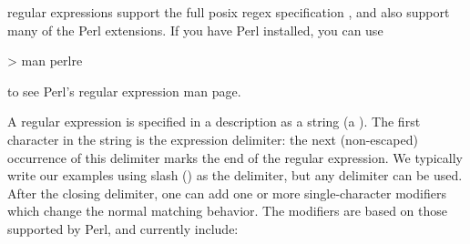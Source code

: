 \pads{} regular expressions support the full posix regex specification
,
and also support many of the Perl extensions.  If you have Perl
installed, you can use 

\begin{centercode}
    > man perlre
\end{centercode}
%
\noindent
to see Perl's regular expression man page.

A regular expression is specified in a \pads{} description
as a string (a ).  The first character in
the string is the expression delimiter: the next (non-escaped) occurrence of
this delimiter marks the end of the regular expression.
We typically write our examples using slash (\cd{/}) as the
delimiter, but any delimiter can be used.  After the closing
delimiter, one can add one or more single-character
modifiers which change the normal matching behavior.  The
modifiers are based on those supported by Perl, and
currently include:
